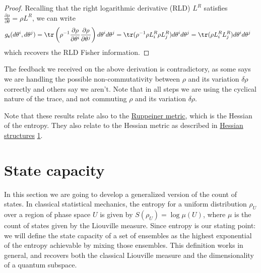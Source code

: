 \begin{mathSection}
\begin{proof}
	Recalling that the right logarithmic derivative (RLD) $L^R$ satisfies $\frac{\partial \rho}{\partial \theta} = \rho L^R$, we can write 
	\begin{equation}
		\begin{aligned}
			g_{\ens}(d\theta^i, d\theta^j) &= \tr\left( \rho^{-1} \frac{\partial \rho}{\partial \theta^i }\frac{\partial \rho}{\partial \theta^j}\right) d\theta^i d\theta^j = \tr(\rho^{-1}\rho L^R
			_i \rho L^R_j)d\theta^i d\theta^j = \tr(\rho L^R
			_i L^R_j)d\theta^i d\theta^j
		\end{aligned}
	\end{equation}
	which recovers the RLD Fisher information.
\end{proof}

\begin{remark}
	The feedback we received on the above derivation is contradictory, as some says we are handling the possible non-commutativity between $\rho$ and its variation $\delta \rho$ correctly and others say we aren't. Note that in all steps we are using the cyclical nature of the trace, and not commuting $\rho$ and its variation $\delta \rho$.
\end{remark}

\begin{remark}
	Note that these results relate also to the \href{https://en.wikipedia.org/wiki/Ruppeiner_geometry}{Ruppeiner metric}, which is the Hessian of the entropy. They also relate to the Hessian metric as described in  \href{https://web.osu.cz/~Zusmanovich/seminar/2017/wolak/ostrava-11-17-hessian-pdf.pdf}{Hessian structures} \href{https://link.springer.com/chapter/10.1007/978-3-642-40020-9_4}{1}.
\end{remark}
\end{mathSection}

\section{State capacity}

In this section we are going to develop a generalized version of the count of states. In classical statistical mechanics, the entropy for a uniform distribution $\rho_U$ over a region of phase space $U$ is given by $S(\rho_U) = \log \mu(U)$, where $\mu$ is the count of states given by the Liouville measure. Since entropy is our stating point: we will define the state capacity of a set of ensembles as the highest exponential of the entropy achievable by mixing those ensembles. This definition works in general, and recovers both the classical Liouville measure and the dimensionality of a quantum subspace.

